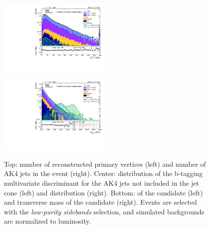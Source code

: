 \begin{figure}[!htb]
\begin{center}
    \includegraphics[width=0.495\textwidth]{plots/v9_U/XVZnnlpSB/X_pt.pdf}
    \includegraphics[width=0.495\textwidth]{plots/v9_U/XVZnnlpSB/X_tmass.pdf}

    \caption{Top: number of reconstructed primary vertices (left) and number of AK4 jets in the event (right). Center: distribution of the b-tagging multivariate discriminant for the AK4 jets not included in the \V jet cone (left) and \MET distribution (right). Bottom: \pt of the \VZ candidate (left) and transverse mass of the \VZ candidate (right). Events are selected with the \emph{low-purity sidebands} selection, and simulated backgrounds are normalized to luminosity.}
  \end{center}
\end{figure}


